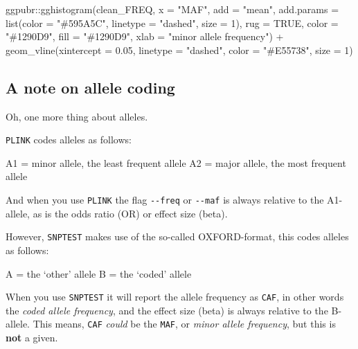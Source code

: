 \documentclass[
]{book}
\newenvironment{Shaded}{\begin{snugshade}}{\end{snugshade}}
\newcommand{\AttributeTok}[1]{\textcolor[rgb]{0.77,0.63,0.00}{#1}}
\newcommand{\ConstantTok}[1]{\textcolor[rgb]{0.00,0.00,0.00}{#1}}
\newcommand{\DecValTok}[1]{\textcolor[rgb]{0.00,0.00,0.81}{#1}}
\newcommand{\FloatTok}[1]{\textcolor[rgb]{0.00,0.00,0.81}{#1}}
\newcommand{\FunctionTok}[1]{\textcolor[rgb]{0.00,0.00,0.00}{#1}}
\newcommand{\NormalTok}[1]{#1}
\newcommand{\SpecialCharTok}[1]{\textcolor[rgb]{0.00,0.00,0.00}{#1}}
\newcommand{\StringTok}[1]{\textcolor[rgb]{0.31,0.60,0.02}{#1}}
\begin{document}
\begin{Shaded}
\begin{Highlighting}[]
\NormalTok{ggpubr}\SpecialCharTok{::}\FunctionTok{gghistogram}\NormalTok{(clean\_FREQ, }\AttributeTok{x =} \StringTok{"MAF"}\NormalTok{,}
                    \AttributeTok{add =} \StringTok{"mean"}\NormalTok{, }\AttributeTok{add.params =} \FunctionTok{list}\NormalTok{(}\AttributeTok{color =} \StringTok{"\#595A5C"}\NormalTok{, }\AttributeTok{linetype =} \StringTok{"dashed"}\NormalTok{, }\AttributeTok{size =} \DecValTok{1}\NormalTok{),}
                    \AttributeTok{rug =} \ConstantTok{TRUE}\NormalTok{,}
                    \AttributeTok{color =} \StringTok{"\#1290D9"}\NormalTok{, }\AttributeTok{fill =} \StringTok{"\#1290D9"}\NormalTok{,}
                    \AttributeTok{xlab =} \StringTok{"minor allele frequency"}\NormalTok{) }\SpecialCharTok{+}
  \FunctionTok{geom\_vline}\NormalTok{(}\AttributeTok{xintercept =} \FloatTok{0.05}\NormalTok{, }\AttributeTok{linetype =} \StringTok{"dashed"}\NormalTok{,}
                \AttributeTok{color =} \StringTok{"\#E55738"}\NormalTok{, }\AttributeTok{size =} \DecValTok{1}\NormalTok{)}
\end{Highlighting}
\end{Shaded}

\hypertarget{a-note-on-allele-coding}{%
\subsection{A note on allele coding}\label{a-note-on-allele-coding}}

Oh, one more thing about alleles.

\texttt{PLINK} codes alleles as follows:

A1 = minor allele, the least frequent allele
A2 = major allele, the most frequent allele

And when you use \texttt{PLINK} the flag \texttt{-\/-freq} or \texttt{-\/-maf} is always relative to the A1-allele, as is the odds ratio (OR) or effect size (beta).

However, \texttt{SNPTEST} makes use of the so-called OXFORD-format, this codes alleles as follows:

A = the `other' allele
B = the `coded' allele

When you use \texttt{SNPTEST} it will report the allele frequency as \texttt{CAF}, in other words the \emph{coded allele frequency}, and the effect size (beta) is always relative to the B-allele. This means, \texttt{CAF} \emph{could} be the \texttt{MAF}, or \emph{minor allele frequency}, but this is \textbf{not} a given.
\end{document}

